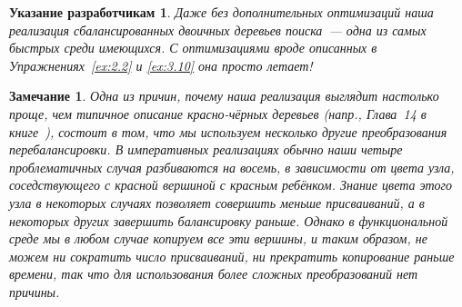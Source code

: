 \documentclass[aspectratio=169
  , xcolor={svgnames}
  , hyperref={ colorlinks,citecolor=DeepPink4
             , linkcolor=DarkRed,urlcolor=DarkBlue}
  , russian
  ]{beamer}
\newtheorem{remark}{\textbf{Замечание}}[section]
\newtheorem{hint}{\textbf{Указание разработчикам}}[section]
\theoremstyle{exerciseStyle1}
\renewcommand{\cite}[1]{}
\begin{document}
\begin{frame}[fragile]{}
\begin{figure}[h]
  \centering
  
  \label{fig:3.5}
\end{figure}
\end{frame}

\begin{frame}[fragile]{}
\begin{figure}[h]
  \centering
  
  \label{fig:3.5.2}
\end{figure}
\end{frame}

\begin{frame}[fragile]{}
\begin{hint}
  Даже без дополнительных оптимизаций наша реализация сбалансированных
  двоичных деревьев поиска~--- одна из самых быстрых среди
  имеющихся. С оптимизациями вроде описанных в
  Упражнениях~\ref{ex:2.2} и \ref{ex:3.10} она просто летает!
\end{hint}
\end{frame}


\begin{frame}[fragile]{}
\begin{remark}
  Одна из причин, почему наша реализация выглядит настолько проще, чем
  типичное описание красно-чёрных деревьев (напр., Глава~14 в
  книге~\cite{CormenLeisersonRivest1990}), состоит в том, что мы
  используем несколько другие преобразования перебалансировки. В
  императивных реализациях обычно наши четыре проблематичных случая
  разбиваются на восемь, в зависимости от цвета узла, соседствующего с
  красной вершиной с красным ребёнком.  Знание цвета этого узла в
  некоторых случаях позволяет совершить меньше присваиваний, а в
  некоторых других завершить балансировку раньше. Однако в
  функциональной среде мы в любом случае копируем все эти вершины, и
  таким образом, не можем ни сократить число присваиваний, ни
  прекратить копирование раньше времени, так что для использования
  более сложных преобразований нет причины.
\end{remark}

\end{frame}
\end{document}
